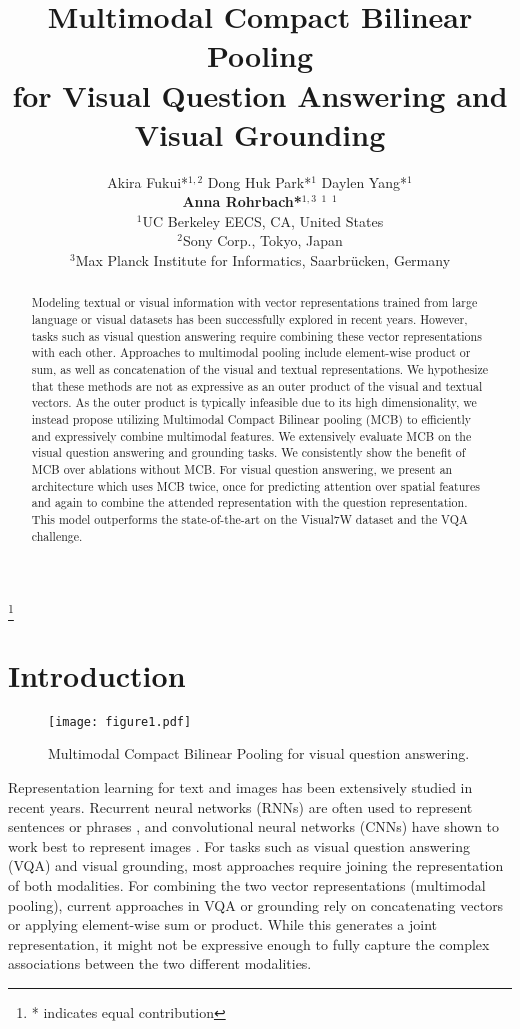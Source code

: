 \documentclass[11pt,letterpaper]{article}
\title{Multimodal Compact Bilinear Pooling\\for Visual Question Answering and Visual Grounding}
\author{
 Akira Fukui*$^{1,2}$ \authSpace Dong Huk Park*$^{1}$ \authSpace Daylen Yang*$^{1}$ \\ {\bf Anna Rohrbach*}$^{1,3}$ \authSpace {\bf Trevor Darrell}$^{1}$ \authSpace {\bf Marcus Rohrbach}$^{1}$\\
$^{1}$UC Berkeley EECS,  CA, United States\\
$^{2}$Sony Corp., Tokyo, Japan\\
$^{3}$Max Planck Institute for Informatics, Saarbr{\"u}cken, Germany\\
}
\date{}
\newcommand\blfootnote[1]{\begingroup
  \renewcommand\thefootnote{}\footnote{#1}\addtocounter{footnote}{-1}\endgroup
}
\begin{document}
\maketitle
\blfootnote{* indicates equal contribution}


\begin{abstract}
Modeling textual or visual information with vector representations trained from large language or visual datasets has been successfully explored in recent years. However, tasks such as  visual question answering require combining these vector representations with each other. Approaches to multimodal pooling include element-wise product or sum, as well as concatenation of the visual and textual representations. We hypothesize that these methods are not as expressive as an outer product of the visual and textual vectors. As the outer product is typically infeasible due to its high dimensionality, we instead propose utilizing Multimodal Compact Bilinear pooling (MCB) to efficiently and expressively combine multimodal features. We extensively evaluate MCB on the visual question answering and grounding tasks. We consistently show the benefit of  MCB over ablations without MCB. For visual question answering, we present an architecture which uses MCB twice, once for predicting attention over spatial features and again to combine the attended representation with the question representation. This model outperforms the state-of-the-art on the Visual7W dataset and the VQA challenge.
\end{abstract}

\section{Introduction}
\begin{figure}[t]
\texttt{[image: figure1.pdf]}
\vspace{-0.5cm}
\caption{Multimodal Compact Bilinear Pooling for visual question answering.}
\label{fig:teaser}
\end{figure}

Representation learning for text and images has been extensively studied in recent years. Recurrent neural networks (RNNs) are often used to represent sentences or phrases \cite{sutskever14nips,kiros15nips}, and convolutional neural networks (CNNs) have shown to work best to represent images \cite{donahue14icml,he2015deep}. For tasks such as visual question answering (VQA) and visual grounding, most approaches require joining the representation of both modalities. For combining the two vector representations (multimodal pooling),
current approaches in VQA or grounding rely on concatenating vectors or applying element-wise sum or product. While this generates a joint representation, it might not be expressive enough to fully capture the complex associations between the two different modalities. 
    
\end{document}
